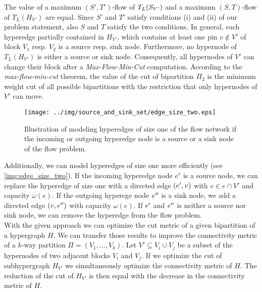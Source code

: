 The value of a maximum $(S',T')$-flow of $T_L(S_{V'})$ and a maximum $(S,T)$-flow
of $T_L(H_{V'})$ are equal. Since $S'$ and $T'$ satisfy conditions (i) and (ii) of our 
problem statement, also $S$ and $T$ satisfy the two conditions. 
In general, each hyperedge partially contained in $H_{V'}$, which contains at least one pin
$v \notin V'$ of block $V_1$ resp. $V_2$ is a source resp. sink node. Furthermore, no hypernode
of $T_L(H_{V'})$ is either a source or sink node. Consequently, all hypernodes of $V'$
can change their block after a \emph{Max-Flow-Min-Cut} computation. According to the 
\emph{max-flow-min-cut} theorem, the value of the cut of bipartition $\Pi_2$ is the minimum
weight cut of all possible bipartitions with the restriction that only hypernodes of $V'$ can move.\\
\begin{figure}
\centering
\texttt{[image: ../img/source\_and\_sink\_set/edge\_size\_two.eps]}
\caption{Illustration of modeling hyperedges of size one of the flow network
         if the incoming or outgoing hyperedge node is a source or a sink node 
         of the flow problem.}
\label{img:edge_size_two}
\end{figure}
Additionally, we can model hyperedges of size one more efficiently (see \autoref{img:edge_size_two}).
If the incoming hyperedge node $e'$ is a source node, we can replace the hyperedge of
size one with a directed edge $(e',v)$ with $v \in e \cap V'$ and capacity $\omega(e)$.
If the outgoing hyperege node $e''$ is a sink node, we add a directed edge
$(v,e'')$ with capacity $\omega(e)$. If $e'$ and $e''$ is neither a source
nor sink node, we can remove the hyperedge from the flow problem. \\
With the given approach we can optimize the cut metric of a given
bipartition of a hypergraph $H$. We can transfer those results to improve the connectivity metric
of a $k$-way partition $\Pi = (V_1,\ldots,V_k)$. 
Let $V' \subseteq V_i \cup V_j$ be a subset of the hypernodes of two adjacent
blocks $V_i$ and $V_j$. If we optimize the cut of
subhypergraph $H_{V'}$ we simultaneously optimize the connectivity metric of $H$.
The reduction of the cut of $H_{V'}$ is then equal with the decrease in
the connectivity metric of $H$.

